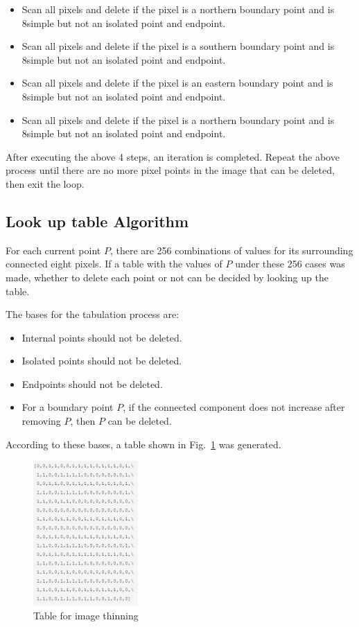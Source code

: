 \documentclass[hyperref]{article}
\theoremstyle{nonumberplain}
\begin{document}
	\begin{itemize}
		\item[Step 1.] Scan all pixels and delete if the pixel is a northern boundary point and is 8simple but not an isolated point and endpoint.
		\item[Step 2.] Scan all pixels and delete if the pixel is a southern boundary point and is 8simple but not an isolated point and endpoint.
		\item[Step 3.] Scan all pixels and delete if the pixel is an eastern boundary point and is 8simple but not an isolated point and endpoint.
		\item[Step 4.] Scan all pixels and delete if the pixel is a northern boundary point and is 8simple but not an isolated point and endpoint.
	\end{itemize}

	After executing the above 4 steps, an iteration is completed. Repeat the above process until there are no more pixel points in the image that can be deleted, then exit the loop.
	
	\subsection{Look up table Algorithm}
	
	\hspace{1.0em}
	For each current point $P$, there are 256 combinations of values for its surrounding connected eight pixels. If a table with the values of $P$ under these 256 cases was made, whether to delete each point or not can be decided by looking up the table.
	
	The bases for the tabulation process are:
	
	\begin{itemize}
		\item Internal points should not be deleted.
		\item Isolated points should not be deleted.
		\item Endpoints should not be deleted.
		\item For a boundary point $P$, if the connected component does not increase after removing $P$, then $P$ can be deleted.
	\end{itemize}

	According to these bases, a table shown in Fig.~\ref{fig12} was generated.
	
	\begin{figure}[htbp]
		\centering
		\centering
		\includegraphics[width=4cm]{table.png}
		\caption{Table for image thinning}
		\label{fig12}
	\end{figure}
	
\end{document}
